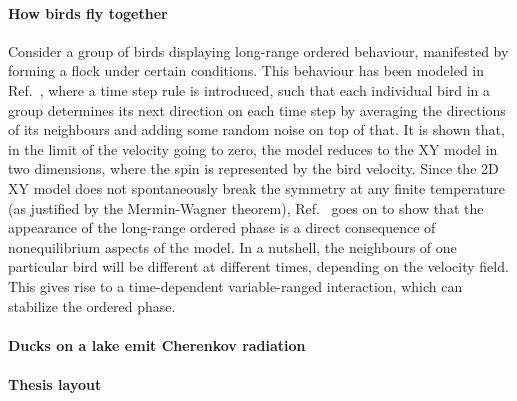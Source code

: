\paragraph{How birds fly together}
Consider a group of birds displaying long-range ordered behaviour,
manifested by forming a flock under certain conditions. This behaviour
has been modeled in Ref.~\cite{Toner1995}, where a time step rule is
introduced, such that each individual bird in a group determines its
next direction on each time step by averaging the directions of its
neighbours and adding some random noise on top of that. It is shown
that, in the limit of the velocity going to zero, the model reduces to
the XY model in two dimensions, where the spin is represented by the
bird velocity. Since the 2D XY model does not spontaneously break the
symmetry at any finite temperature (as justified by the Mermin-Wagner
theorem), Ref.~\cite{Toner1995} goes on to show that the appearance of
the long-range ordered phase is a direct consequence of nonequilibrium
aspects of the model. In a nutshell, the neighbours of one particular
bird will be different at different times, depending on the velocity
field. This gives rise to a time-dependent variable-ranged
interaction, which can stabilize the ordered phase.

\paragraph{Ducks on a lake emit Cherenkov radiation}

\paragraph{Thesis layout}


